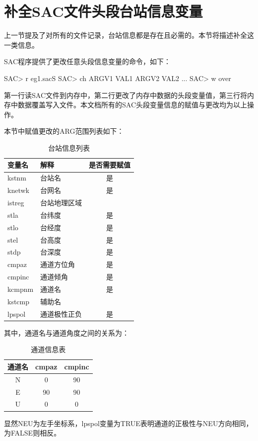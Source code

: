 \documentclass[a4paper]{article}
\begin{document}
\clearpage\section{补全SAC文件头段台站信息变量}
上一节提及了对所有的文件记录，台站信息都是存在且必需的。本节将描述补全这一类信息。\par
SAC程序提供了更改任意头段信息变量的命令，如下：\par

\begin{SACCode}
SAC> r eg1.sacS
SAC> ch ARGV1 VAL1 ARGV2 VAL2 ...
SAC> w over
\end{SACCode}

第一行读SAC文件到内存中，第二行更改了内存中数据的头段变量值，第三行将内存中数据覆盖写入文件。本文档所有的SAC头段变量信息的赋值与更改均为以上操作。\par
本节中赋值更改的ARG范围列表如下：
\begin{table}[!htbp]
	\centering
	\caption{台站信息列表}\label{tab::StInfoTab}
	\begin{tabular}{llc}
	\toprule
	变量名	&解释				&	是否需要赋值\\\midrule
	kstnm	&台站名				&	是\\
	knetwk	&台网名 				&	是\\\midrule
	istreg	&台站地理区域\\
	stla	&台纬度				&	是\\
	stlo	&台经度				&	是\\
	stel	&台高度				&	是\\
	stdp	&台深度				&	是\\\midrule
	cmpaz	&通道方位角			&	是\\
	cmpinc	&通道倾角			&	是\\
	kcmpnm	&通道名				&	是\\
	kstcmp	&辅助名\\
	lpspol	&通道极性正负			&	是\\
	
	\bottomrule
	\end{tabular}
\end{table}
其中，通道名与通道角度之间的关系为：
\begin{table}[!htbp]
	\centering
	\caption{通道信息表}\label{tab::CmpInfo}
	\begin{tabular}{ccc}
	\toprule
	通道名	&cmpaz	&	cmpinc\\\midrule
	N		&0		&90\\
	E		&90		&90\\
	U		&0		&0\\
	\bottomrule
	\end{tabular}
\end{table}
\par
显然NEU为左手坐标系，lpspol变量为TRUE表明通道的正极性与NEU方向相同，为FALSE则相反。
\end{document}
